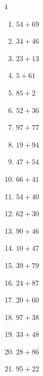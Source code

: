 \begin{multicols}{4}
\begin{enumerate}
  \item $54+69$
        \phantom{$=123$}

  \item $34+46$
        \phantom{$=80$}

\columnbreak %

  \item $23+13$
        \phantom{$=36$}

  \item $5+61$
        \phantom{$=66$}

  \item $85+2$
        \phantom{$=87$}

  \item $52+36$
        \phantom{$=88$}

  \item $97+77$
        \phantom{$=174$}

  \item $19+94$
        \phantom{$=113$}

  \item $47+54$
        \phantom{$=101$}

  \item $66+41$
        \phantom{$=107$}

  \item $54+40$
        \phantom{$=94$}

  \item $62+30$
        \phantom{$=92$}

  \item $90+46$
        \phantom{$=136$}

  \item $10+47$
        \phantom{$=57$}

  \item $39+79$
        \phantom{$=118$}

  \item $24+87$
        \phantom{$=111$}

  \item $20+60$
        \phantom{$=80$}

  \item $97+38$
        \phantom{$=135$}

  \item $33+48$
        \phantom{$=81$}

  \item $28+86$
        \phantom{$=114$}

  \item $95+22$
        \phantom{$=117$}


\end{enumerate}
\end{multicols}
